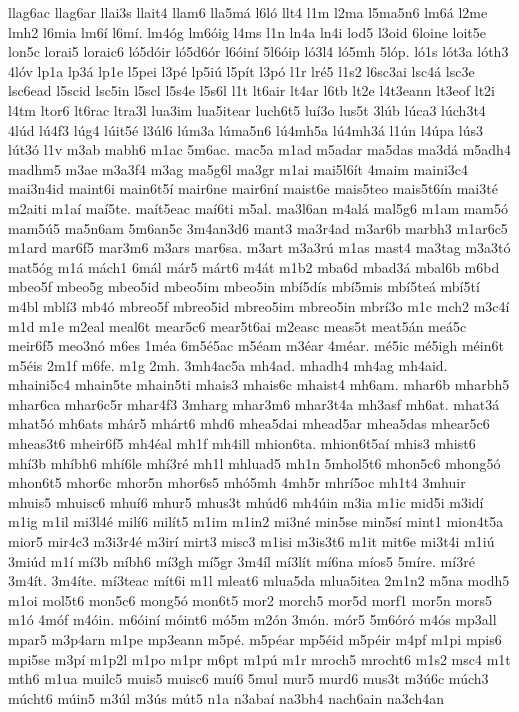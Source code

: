 {llag6ac
llag6ar
llai3s
llait4
llam6
lla5má
l6ló
llt4
l1m
l2ma
l5ma5n6
lm6á
l2me
lmh2
l6mia
lm6í
l6mí.
lm4óg
lm6óig
l4ms
l1n
ln4a
ln4i
lod5
l3oid
6loine
loit5e
lon5c
lorai5
loraic6
ló5dóir
ló5d6ór
l6óiní
5l6óip
ló3l4
ló5mh
5lóp.
ló1s
lót3a
lóth3
4lóv
lp1a
lp3á
lp1e
l5pei
l3pé
lp5iú
l5pít
l3pó
l1r
lré5
l1s2
l6sc3ai
lsc4á
lsc3e
lsc6ead
l5scid
lsc5in
l5scl
l5s4e
l5s6l
l1t
lt6air
lt4ar
l6tb
lt2e
l4t3eann
lt3eof
lt2i
l4tm
ltor6
lt6rac
ltra3l
lua3im
lua5itear
luch6t5
luí3o
lus5t
3lúb
lúca3
lúch3t4
4lúd
lú4f3
lúg4
lúit5é
l3úl6
lúm3a
lúma5n6
lú4mh5a
lú4mh3á
l1ún
l4úpa
lús3
lút3ó
l1v
m3ab
mabh6
m1ac
5m6ac.
mac5a
m1ad
m5adar
ma5das
ma3dá
m5adh4
madhm5
m3ae
m3a3f4
m3ag
ma5g6l
ma3gr
m1ai
mai5l6ít
4maim
maini3c4
mai3n4id
maint6i
main6t5í
mair6ne
mair6ní
maist6e
mais5teo
mais5t6ín
mai3té
m2aiti
m1aí
maí5te.
maít5eac
maí6ti
m5al.
ma3l6an
m4alá
mal5g6
m1am
mam5ó
mam5ú5
ma5n6am
5m6an5c
3m4an3d6
mant3
ma3r4ad
m3ar6b
marbh3
m1ar6c5
m1ard
mar6f5
mar3m6
m3ars
mar6sa.
m3art
m3a3rú
m1as
mast4
ma3tag
m3a3tó
mat5óg
m1á
mách1
6mál
már5
márt6
m4át
m1b2
mba6d
mbad3á
mbal6b
m6bd
mbeo5f
mbeo5g
mbeo5id
mbeo5im
mbeo5in
mbí5dís
mbí5mis
mbí5teá
mbí5tí
m4bl
mblí3
mb4ó
mbreo5f
mbreo5id
mbreo5im
mbreo5in
mbrí3o
m1c
mch2
m3c4í
m1d
m1e
m2eal
meal6t
mear5c6
mear5t6ai
m2easc
meas5t
meat5án
meá5c
meir6f5
meo3nó
m6es
1méa
6m5é5ac
m5éam
m3éar
4méar.
mé5ic
mé5igh
méin6t
m5éis
2m1f
m6fe.
m1g
2mh.
3mh4ac5a
mh4ad.
mhadh4
mh4ag
mh4aid.
mhaini5c4
mhain5te
mhain5ti
mhais3
mhais6c
mhaist4
mh6am.
mhar6b
mharbh5
mhar6ca
mhar6c5r
mhar4f3
3mharg
mhar3m6
mhar3t4a
mh3asf
mh6at.
mhat3á
mhat5ó
mh6ats
mhár5
mhárt6
mhd6
mhea5dai
mhead5ar
mhea5das
mhear5c6
mheas3t6
mheir6f5
mh4éal
mh1f
mh4ill
mhion6ta.
mhion6t5aí
mhis3
mhist6
mhí3b
mhíbh6
mhí6le
mhí3ré
mh1l
mhluad5
mh1n
5mhol5t6
mhon5c6
mhong5ó
mhon6t5
mhor6c
mhor5n
mhor6s5
mhó5mh
4mh5r
mhrí5oc
mh1t4
3mhuir
mhuis5
mhuisc6
mhuí6
mhur5
mhus3t
mhúd6
mh4úin
m3ia
m1ic
mid5i
m3idí
m1ig
m1il
mi3l4é
milí6
milít5
m1im
m1in2
mi3né
min5se
min5sí
mint1
mion4t5a
mior5
mir4c3
m3i3r4é
m3irí
mirt3
misc3
m1isi
m3is3t6
m1it
mit6e
mi3t4i
m1iú
3miúd
m1í
mí3b
míbh6
mí3gh
mí5gr
3m4íl
mí3lít
mí6na
míos5
5míre.
mí3ré
3m4ít.
3m4íte.
mí3teac
mít6i
m1l
mleat6
mlua5da
mlua5itea
2m1n2
m5na
modh5
m1oi
mol5t6
mon5c6
mong5ó
mon6t5
mor2
morch5
mor5d
morf1
mor5n
mors5
m1ó
4móf
m4óin.
m6óiní
móint6
mó5m
m2ón
3món.
mór5
5m6óró
m4ós
mp3all
mpar5
m3p4arn
m1pe
mp3eann
m5pé.
m5péar
mp5éid
m5péir
m4pf
m1pi
mpis6
mpi5se
m3pí
m1p2l
m1po
m1pr
m6pt
m1pú
m1r
mroch5
mrocht6
m1s2
msc4
m1t
mth6
m1ua
muilc5
muis5
muisc6
muí6
5mul
mur5
murd6
mus3t
m3ú6c
múch3
múcht6
múin5
m3úl
m3ús
mút5
n1a
n3abaí
na3bh4
nach6ain
na3ch4an
}
